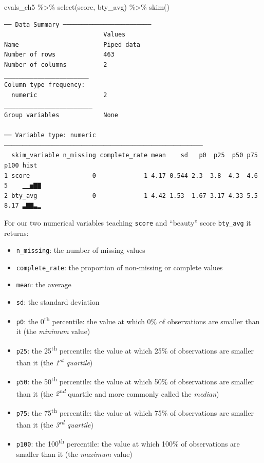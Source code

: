 \documentclass[
  letterpaper,
  DIV=11,
  numbers=noendperiod]{scrreprt}
\newenvironment{Shaded}{\begin{snugshade}}{\end{snugshade}}
\newcommand{\FunctionTok}[1]{\textcolor[rgb]{0.28,0.35,0.67}{#1}}
\newcommand{\NormalTok}[1]{\textcolor[rgb]{0.00,0.23,0.31}{#1}}
\newcommand{\SpecialCharTok}[1]{\textcolor[rgb]{0.37,0.37,0.37}{#1}}
\providecommand{\tightlist}{%
  \setlength{\itemsep}{0pt}\setlength{\parskip}{0pt}}\usepackage{longtable,booktabs,array}
\theoremstyle{definition}
\theoremstyle{remark}
\begin{document}
\begin{Shaded}
\begin{Highlighting}[]
\NormalTok{evals\_ch5 }\SpecialCharTok{\%\textgreater{}\%}
  \FunctionTok{select}\NormalTok{(score, bty\_avg) }\SpecialCharTok{\%\textgreater{}\%}
  \FunctionTok{skim}\NormalTok{()}
\end{Highlighting}
\end{Shaded}

\begin{verbatim}
── Data Summary ────────────────────────
                           Values    
Name                       Piped data
Number of rows             463       
Number of columns          2         
_______________________              
Column type frequency:               
  numeric                  2         
________________________             
Group variables            None      

── Variable type: numeric ──────────────────────────────────────────────────────
  skim_variable n_missing complete_rate mean    sd   p0  p25  p50 p75 p100 hist 
1 score                 0             1 4.17 0.544 2.3  3.8  4.3  4.6 5    ▁▁▅▇▇
2 bty_avg               0             1 4.42 1.53  1.67 3.17 4.33 5.5 8.17 ▃▇▇▃▂ 
\end{verbatim}

For our two numerical variables teaching \texttt{score} and ``beauty''
score \texttt{bty\_avg} it returns:

\begin{itemize}
\tightlist
\item
  \texttt{n\_missing}: the number of missing values
\item
  \texttt{complete\_rate}: the proportion of non-missing or complete
  values
\item
  \texttt{mean}: the average
\item
  \texttt{sd}: the standard deviation
\item
  \texttt{p0}: the 0\textsuperscript{th} percentile: the value at which
  0\% of observations are smaller than it (the \emph{minimum} value)
\item
  \texttt{p25}: the 25\textsuperscript{th} percentile: the value at
  which 25\% of observations are smaller than it (the
  \emph{1\textsuperscript{st} quartile})
\item
  \texttt{p50}: the 50\textsuperscript{th} percentile: the value at
  which 50\% of observations are smaller than it (the
  \emph{2\textsuperscript{nd}} quartile and more commonly called the
  \emph{median})
\item
  \texttt{p75}: the 75\textsuperscript{th} percentile: the value at
  which 75\% of observations are smaller than it (the
  \emph{3\textsuperscript{rd} quartile})
\item
  \texttt{p100}: the 100\textsuperscript{th} percentile: the value at
  which 100\% of observations are smaller than it (the \emph{maximum}
  value)
\end{itemize}
\end{document}
